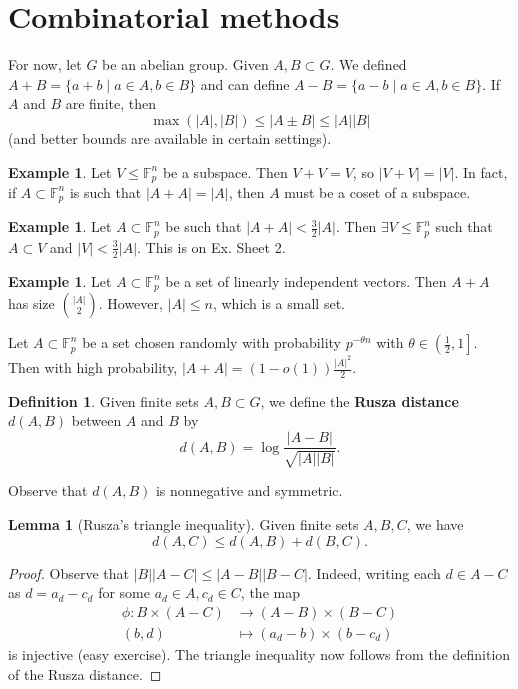 \documentclass{article}
\theoremstyle{definition}
\newtheorem{lemma}[theorem]{Lemma}
\newtheorem{example}[theorem]{Example}
\newtheorem{defn}[theorem]{Definition}
\begin{document}
\section{Combinatorial methods}
For now, let $G$ be an abelian group. Given $A,B \subset G$. We defined $A+B = \{a + b \mid a \in A, b \in B\}$ and can define $A - B = \{a-b \mid a \in A, b \in B\}$. If $A$ and $B$ are finite, then $$\max(\left|A \right|,\left|B \right|)\le \left|A\pm B \right| \le \left|A \right|\left|B \right|$$
(and better bounds are available in certain settings).
\begin{example}
    Let $V\le \mathbb{F}_p^n$ be a subspace. Then $V+V=V$, so $\left|V+V \right| = \left|V \right|$. In fact, if $A \subset \mathbb{F}_p^n$ is such that $\left|A+A \right|=\left|A \right|$, then $A$ must be a coset of a subspace.
\end{example}
\begin{example}\label{example2.2}
    Let $A \subset \mathbb{F}_p^n$ be such that $\left|A+A \right|<\frac{3}{2}\left|A \right|$. Then $\exists V \le \mathbb{F}_p^n$ such that $A \subset V$ and $\left|V\right|<\frac{3}{2}\left|A\right|$. This is on Ex. Sheet 2.
\end{example}
\begin{example}\label{example2.3}
    Let $A \subset \mathbb{F}_p^n$ be a set of linearly independent vectors. Then $A+A$ has size ${\left|A\right|\choose 2}$. However, $\left|A\right|\le n$, which is a small set.
    \vspace{1mm}
     
    Let $A \subset \mathbb{F}_p^n$ be a set chosen randomly with probability $p^{-\theta n}$ with $\theta \in \left(\frac{1}{2},1\right]$. Then with high probability, $\left|A+A\right| = (1-o(1))\frac{\left|A\right|^2}{2}$.
\end{example}
\begin{defn}
    Given finite sets $A,B \subset G$, we define the \textbf{Rusza distance} $d(A,B)$ between $A$ and $B$ by $$d(A,B) = \log \frac{\left|A-B\right|}{\sqrt{\left|A\right|\left|B\right|}}.$$
\end{defn}
Observe that $d(A,B)$ is nonnegative and symmetric.
\begin{lemma}[Rusza's triangle inequality]\label{lemma2.5}
    Given finite sets $A,B,C$, we have \[
    d(A,C) \le d(A,B) + d(B,C).
    \]
\end{lemma}
\begin{proof}
    Observe that $\left|B\right|\left|A-C\right| \le \left|A-B\right|\left|B-C\right|$. Indeed, writing each $d \in A-C$ as $d = a_d-c_d$ for some $a_d \in A, c_d \in C$, the map \begin{align*}
        \phi: B \times (A-C) &\to (A-B)\times(B-C)\\
        (b,d) &\mapsto (a_d-b)\times(b-c_d)
    \end{align*}
    is injective (easy exercise). The triangle inequality now follows from the definition of the Rusza distance. 
\end{proof}
\end{document}
